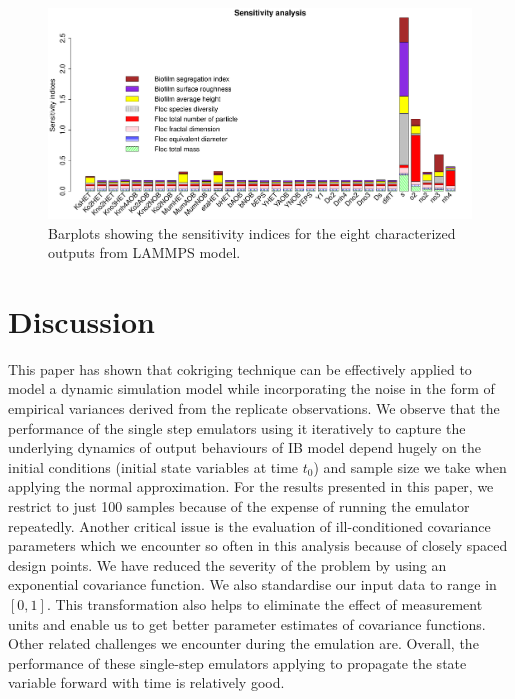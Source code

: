 \begin{figure}[!ht] 
\includegraphics[width=1.1\textwidth]{result2/sens_plot1}
\caption[]{Barplots showing the sensitivity indices for the eight characterized outputs from LAMMPS model.}\label{ress4}
\end{figure}


\section{Discussion}
This paper has shown that cokriging technique can be effectively applied to model a dynamic simulation model while incorporating the noise in the form of empirical variances derived from the replicate observations. We observe that the performance of the single step emulators using it iteratively to capture the underlying dynamics of output behaviours of IB model depend hugely on the initial conditions (initial state variables at time $t_0$) and sample size we take when applying the normal approximation. For the results presented in this paper, we restrict to just 100 samples because of the expense of running the emulator repeatedly. Another critical issue is the evaluation of ill-conditioned covariance parameters which we encounter so often in this analysis because of closely spaced design points. We have reduced the severity of the problem by using an exponential covariance function. We also standardise our input data to range in $[0,1]$.  This transformation also helps to eliminate the effect of measurement units and enable us to get better parameter estimates of covariance functions. Other related challenges we encounter during the emulation are. Overall, the performance of these single-step emulators applying to propagate the state variable forward with time is relatively good.

